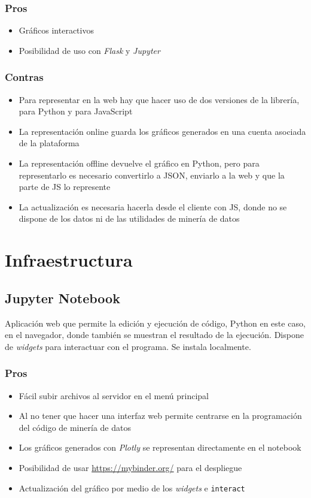 \subsubsection{Pros}
\begin{itemize}
	\item Gráficos interactivos
	\item Posibilidad de uso con \textit{Flask} y \textit{Jupyter}
\end{itemize}
\subsubsection{Contras}
\begin{itemize}
	\item Para representar en la web hay que hacer uso de dos versiones de la librería, para Python y para JavaScript
	\item La representación online guarda los gráficos generados en una cuenta asociada de la plataforma
	\item La representación offline devuelve el gráfico en Python, pero para representarlo es necesario convertirlo a JSON, enviarlo a la web y que la parte de JS lo represente
	\item La actualización es necesaria hacerla desde el cliente con JS, donde no se dispone de los datos ni de las utilidades de minería de datos
\end{itemize}

\section{Infraestructura}
\subsection{Jupyter Notebook}
Aplicación web que permite la edición y ejecución de código, Python en este caso, en el navegador, donde también se muestran el resultado de la ejecución. Dispone de \textit{widgets} para interactuar con el programa. Se instala localmente.
\subsubsection{Pros}
\begin{itemize}
	\item Fácil subir archivos al servidor en el menú principal
	\item Al no tener que hacer una interfaz web permite centrarse en la programación del código de minería de datos
	\item Los gráficos generados con \textit{Plotly} se representan directamente en el notebook
	\item Posibilidad de usar \url{https://mybinder.org/} para el despliegue
	\item Actualización del gráfico por medio de los \textit{widgets} e \verb|interact|
\end{itemize}
